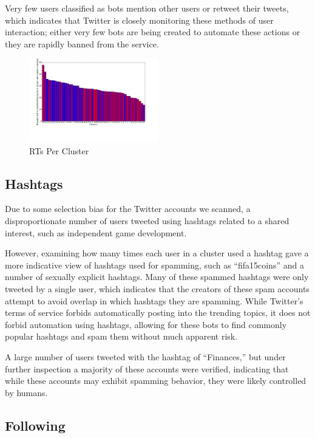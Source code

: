 \documentclass{sig-alternate-05-2015}
\begin{document}
Very few users classified as bots mention other users or retweet their tweets, which indicates that Twitter is closely monitoring these methods of user interaction; either very few bots are being created to automate these actions or they are rapidly banned from the service.

\begin{figure}[h!]
	\caption{RTs Per Cluster}
	\centering
		\includegraphics[width=0.5\textwidth]{imgs/acctsrtpercluster}
\end{figure}

\subsection{Hashtags}

Due to some selection bias for the Twitter accounts we scanned, a disproportionate number of users tweeted using hashtags related to a shared interest, such as independent game development.

However, examining how many times each user in a cluster used a hashtag gave a more indicative view of hashtags used for spamming, such as ``fifa15coins'' and a number of sexually explicit hashtags. Many of these spammed hashtags were only tweeted by a single user, which indicates that the creators of these spam accounts attempt to avoid overlap in which hashtags they are spamming. While Twitter's terms of service forbids automatically posting into the trending topics, it does not forbid automation using hashtags, allowing for these bots to find commonly popular hashtags and spam them without much apparent risk.

A large number of users tweeted with the hashtag of ``Finances,'' but under further inspection a majority of these accounts were verified, indicating that while these accounts may exhibit spamming behavior, they were likely controlled by humans.

\subsection{Following}
\end{document}
